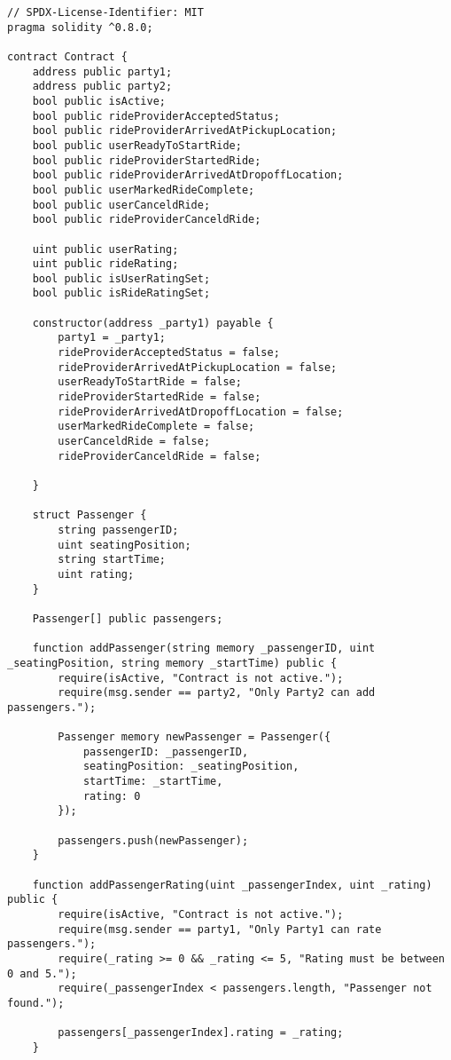 \begin{lstlisting}
// SPDX-License-Identifier: MIT
pragma solidity ^0.8.0;

contract Contract {
    address public party1;
    address public party2;
    bool public isActive;
    bool public rideProviderAcceptedStatus;
    bool public rideProviderArrivedAtPickupLocation;
    bool public userReadyToStartRide;
    bool public rideProviderStartedRide;
    bool public rideProviderArrivedAtDropoffLocation;
    bool public userMarkedRideComplete;
    bool public userCanceldRide;
    bool public rideProviderCanceldRide;

    uint public userRating;
    uint public rideRating;
    bool public isUserRatingSet;
    bool public isRideRatingSet;

    constructor(address _party1) payable {
        party1 = _party1;
        rideProviderAcceptedStatus = false;
        rideProviderArrivedAtPickupLocation = false;
        userReadyToStartRide = false;
        rideProviderStartedRide = false;
        rideProviderArrivedAtDropoffLocation = false;
        userMarkedRideComplete = false;
        userCanceldRide = false;
        rideProviderCanceldRide = false;

    }

    struct Passenger {
        string passengerID;
        uint seatingPosition;
        string startTime;
        uint rating;
    }

    Passenger[] public passengers;

    function addPassenger(string memory _passengerID, uint _seatingPosition, string memory _startTime) public {
        require(isActive, "Contract is not active.");
        require(msg.sender == party2, "Only Party2 can add passengers.");

        Passenger memory newPassenger = Passenger({
            passengerID: _passengerID,
            seatingPosition: _seatingPosition,
            startTime: _startTime,
            rating: 0
        });

        passengers.push(newPassenger);
    }

    function addPassengerRating(uint _passengerIndex, uint _rating) public {
        require(isActive, "Contract is not active.");
        require(msg.sender == party1, "Only Party1 can rate passengers.");
        require(_rating >= 0 && _rating <= 5, "Rating must be between 0 and 5.");
        require(_passengerIndex < passengers.length, "Passenger not found.");

        passengers[_passengerIndex].rating = _rating;
    }


\end{lstlisting}
